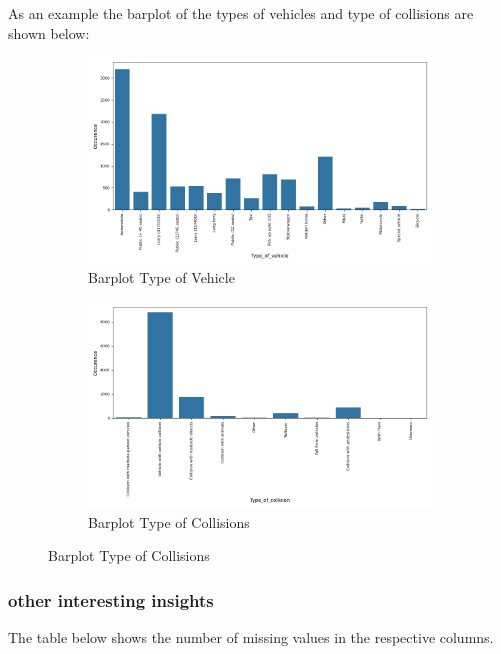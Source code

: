 \documentclass{article}
\begin{document}
As an example the barplot of the types of vehicles and type of collisions are shown below:

\begin{figure}[H]
    \centering
    \begin{subfigure}[b]{0.45\textwidth}
        \centering
        \includegraphics[width=\linewidth]{Type_of_vehicle.png} 
        \caption{Barplot Type of Vehicle}
        \label{fig:figure1}
    \end{subfigure}
    \hspace{0.05\textwidth}
    \begin{subfigure}[b]{0.45\textwidth}
        \centering
        \includegraphics[width=\linewidth]{Type_of_collision.png} 
        \caption{Barplot Type of Collisions}
        \label{fig:figure2}
    \end{subfigure}
    \label{fig:two_figures}
\end{figure}

\subsubsection{other interesting insights}
The table below shows the number of missing values in the respective columns. 
\end{document}
